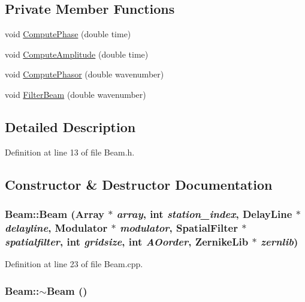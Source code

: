 \subsection*{Private Member Functions}
\begin{DoxyCompactItemize}
\item 
void \hyperlink{classBeam_aeaad2ad917df4957a3da23267e0753a7}{ComputePhase} (double time)
\item 
void \hyperlink{classBeam_ada1230316b0e535d81383a9bb65bf538}{ComputeAmplitude} (double time)
\item 
void \hyperlink{classBeam_a466fbf1bc5b110e62b40a7729be3a87e}{ComputePhasor} (double wavenumber)
\item 
void \hyperlink{classBeam_a8d515929f16780a73c997f659d4c1c97}{FilterBeam} (double wavenumber)
\end{DoxyCompactItemize}


\subsection{Detailed Description}


Definition at line 13 of file Beam.h.



\subsection{Constructor \& Destructor Documentation}
\hypertarget{classBeam_a29260e5e50b1d45b32747442ccdd56f7}{
\subsubsection[{Beam}]{\setlength{\rightskip}{0pt plus 5cm}Beam::Beam ({\bf Array} $\ast$ {\em array}, \/  int {\em station\_\-index}, \/  {\bf DelayLine} $\ast$ {\em delayline}, \/  {\bf Modulator} $\ast$ {\em modulator}, \/  {\bf SpatialFilter} $\ast$ {\em spatialfilter}, \/  int {\em gridsize}, \/  int {\em AOorder}, \/  {\bf ZernikeLib} $\ast$ {\em zernlib})}}
\label{classBeam_a29260e5e50b1d45b32747442ccdd56f7}


Definition at line 23 of file Beam.cpp.

\hypertarget{classBeam_ae00ca4866a8f1f721da45ce7c26c6d74}{
\subsubsection[{$\sim$Beam}]{\setlength{\rightskip}{0pt plus 5cm}Beam::$\sim$Beam ()}}
\label{classBeam_ae00ca4866a8f1f721da45ce7c26c6d74}


